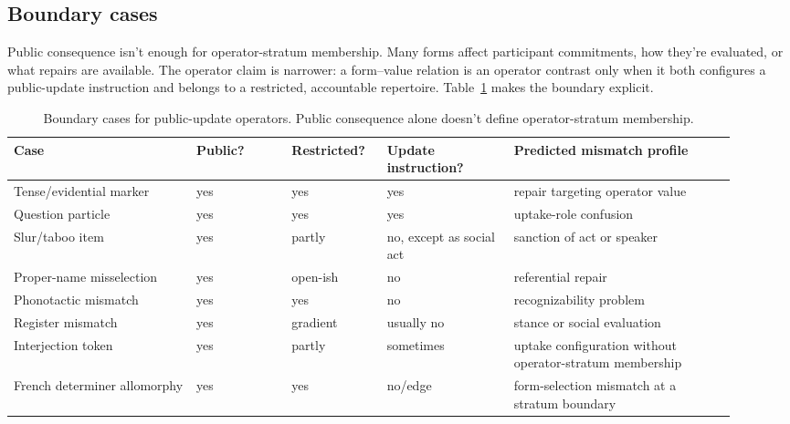 \documentclass[12pt,letterpaper]{article}
\begin{document}
\subsection{Boundary cases}

Public consequence isn't enough for operator-stratum membership. Many forms affect participant commitments, how they're evaluated, or what repairs are available. The operator claim is narrower: a form--value relation is an operator contrast only when it both configures a public-update instruction and belongs to a restricted, accountable repertoire. Table~\ref{tab:boundary-cases} makes the boundary explicit.

\begin{table}[ht]
\centering
\scriptsize
\setlength{\tabcolsep}{3pt}
\begin{tabular}{@{}>{\raggedright\arraybackslash}p{0.23\linewidth}
                >{\centering\arraybackslash}p{0.12\linewidth}
                >{\centering\arraybackslash}p{0.12\linewidth}
                >{\centering\arraybackslash}p{0.16\linewidth}
                >{\raggedright\arraybackslash}p{0.29\linewidth}@{}}
\toprule
\textbf{Case} & \textbf{Public?} & \textbf{Restricted?} & \textbf{Update instruction?} & \textbf{Predicted mismatch profile} \\
\midrule
Tense/evidential marker & yes & yes & yes & repair targeting operator value \\
Question particle & yes & yes & yes & uptake-role confusion \\
Slur/taboo item & yes & partly & no, except as social act & sanction of act or speaker \\
Proper-name misselection & yes & open-ish & no & referential repair \\
Phonotactic mismatch & yes & yes & no & recognizability problem \\
Register mismatch & yes & gradient & usually no & stance or social evaluation \\
Interjection token & yes & partly & sometimes & uptake configuration without operator-stratum membership \\
French determiner allomorphy & yes & yes & no/edge & form-selection mismatch at a stratum boundary \\
\bottomrule
\end{tabular}
\caption{Boundary cases for public-update operators. Public consequence alone doesn't define operator-stratum membership.}
\label{tab:boundary-cases}
\end{table}
\end{document}
